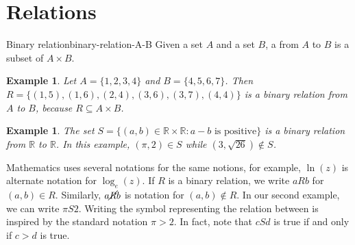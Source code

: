 \documentclass{book}
\newcounter{ekcounter}%
\theoremstyle{ekimcustom}
\newtheorem{example}[ekcounter]{Example}
\newcommand\defn[1]{{\color{blue}{\bf #1}}}
\begin{document}
\section{Relations}\label{section:relations}

\begin{bdefinition}{Binary relation}{binary-relation-A-B}
Given a set $A$ and a set $B$, a \defn{binary relation} from $A$ to $B$ is a subset of $A \times B$.
\end{bdefinition}
\begin{example}
Let $A = \{1,2,3,4\}$ and $B=\{4,5,6,7\}$. Then $R=\{(1,5), (1,6), (2,4), (3,6), (3,7), (4,4)\}$ is a binary relation from $A$ to $B$, because $R \subseteq A \times B$.
\end{example}
\begin{example}\label{example:relation-greater-than}
The set $S = \{(a,b) \in \mathbb{R} \times \mathbb{R} : a-b \text{ is positive}\}$ is a binary relation from $\mathbb{R}$ to $\mathbb{R}$. In this example, $(\pi,2) \in S$ while $(3,\sqrt{26}) \not\in S$.
\end{example}
Mathematics uses several notations for the same notions, for example, $\ln(z)$ is alternate notation for $\log_e(z)$. If $R$ is a binary relation, we write $aRb$ for $(a,b) \in R$. Similarly, $a\cancel{R}b$ is notation for $(a,b) \not\in R$. In our second example, we can write $\pi S 2$. Writing the symbol representing the relation between is inspired by the standard notation $\pi > 2$. In fact, note that $cSd$ is true if and only if $c > d$ is true.

\end{document}
